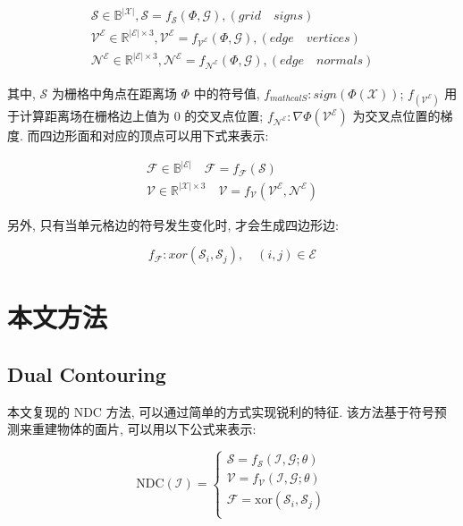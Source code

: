 \begin{align}\label{a}
    \mathcal{S}\in \mathbb{B}^{|\mathcal{X}|},  \mathcal{S}=f_{\mathcal{S}}(\Phi,\mathcal{G}),  (grid \quad signs) \\
    \mathcal{V}^\mathcal{E}\in\mathbb{R}^{|\mathcal{E}|\times 3}, \mathcal{V}^\mathcal{E}=f_{\mathcal{V}^\mathcal{E}}(\Phi,\mathcal{G}), (edge\quad vertices)\\
    \mathcal{N}^\mathcal{E}\in\mathbb{R}^{|\mathcal{E}|\times 3},
    \mathcal{N}^\mathcal{E}=f_{\mathcal{N}^\mathcal{E}}(\Phi,\mathcal{G}), (edge\quad normals)
\end{align}

其中, $\mathcal{S}$ 为栅格中角点在距离场 $\Phi$ 中的符号值, $f_{mathcal{S}}: sign(\Phi(\mathcal{X}))$; $f_(\mathcal{V}^\mathcal{E})$ 用于计算距离场在栅格边上值为 0 的交叉点位置; 
$f_\mathcal{N^E}:\nabla \Phi(\mathcal{V^E})$ 为交叉点位置的梯度. 
而四边形面和对应的顶点可以用下式来表示: 

\begin{align}
    \mathcal{F}\in \mathbb{B}^{|\mathcal{E}|} \quad \mathcal{F}=f_{\mathcal{F}}(\mathcal{S}) \\
    \mathcal{V} \in \mathbb{R}^{|\mathcal{X}| \times 3} \quad \mathcal{V}=f_{\mathcal{V}}(\mathcal{V}^{\mathcal{E}}, \mathcal{N}^{\mathcal{E}})
\end{align}

另外, 只有当单元格边的符号发生变化时, 才会生成四边形边: 

\begin{equation}
    f_{\mathcal{F}}:xor(\mathcal{S}_i, \mathcal{S}_j), \quad (i, j)\in \mathcal{E}
\end{equation}

\section{本文方法}

\subsection{Dual Contouring}

本文复现的 NDC 方法, 可以通过简单的方式实现锐利的特征. 该方法基于符号预测来重建物体的面片, 可以用以下公式来表示: 

\begin{equation}
    \mathrm{NDC}(\mathcal{I}) =
		\begin{cases}
			\mathcal{S} = f_{\mathcal{S}}(\mathcal{I,G};\theta) \\
			\mathcal{V} = f_{\mathcal{V}}(\mathcal{I,G};\theta) \\
			\mathcal{F} = \mathrm{xor}(\mathcal{S}_i, \mathcal{S}_j) \\
		\end{cases}
\end{equation}

